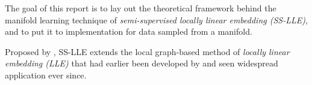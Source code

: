 The goal of this report is to lay out the theoretical framework behind the 
manifold learning technique of \textit{semi-supervised locally linear embedding 
(SS-LLE)}, and to put it to implementation for data sampled from a manifold.

Proposed by \citet{yangetal2006}, SS-LLE extends the local graph-based method 
of \textit{locally linear embedding (LLE)} that had earlier been developed by 
\citet{roweissaul2000} and seen widespread application ever since.
